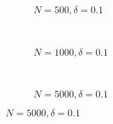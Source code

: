 \documentclass{beamer}
\begin{document}
\begin{frame}
\begin{figure}[h]
  \scriptsize
  \begingroup
  \centering
  \begin{subfigure}[b]{0.31\textwidth}
\caption{\footnotesize $N=500, \delta = 0.1$}
  
  \end{subfigure}
  ~
  \begin{subfigure}[b]{0.31\textwidth}
    \caption{\footnotesize $N=1000, \delta = 0.1$} 
  
  \end{subfigure}
  ~
  \begin{subfigure}[b]{0.31\textwidth}
\caption{\footnotesize $N=5000, \delta = 0.1$}
  
  \end{subfigure}
\endgroup
\end{figure}
\end{frame}
\end{document}
